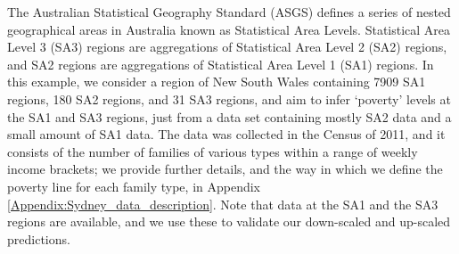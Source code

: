 \documentclass[article]{jss}
\begin{document}



The Australian Statistical Geography Standard (ASGS) defines a series of nested geographical areas in Australia known as Statistical Area Levels. 
Statistical Area Level 3 (SA3) regions are aggregations of Statistical Area Level 2 (SA2) regions, and SA2 regions are aggregations of  Statistical Area Level 1 (SA1) regions. 
In this example, we consider a region of New South Wales containing 7909 SA1 regions, 180 SA2 regions, and 31 SA3 regions, and aim to infer `poverty' levels at the SA1 and SA3 regions, 
just from a data set containing mostly SA2 data and a small amount of SA1 data. 
The data was collected in the Census of 2011, and it consists of the number of families of various types within a range of weekly income brackets; we provide further details, and the way in which we define the poverty line for each family type, in Appendix \ref{Appendix:Sydney_data_description}. 
Note that data at the SA1 and the SA3 regions are available, and we use these to validate our down-scaled and up-scaled predictions.  
\end{document}
